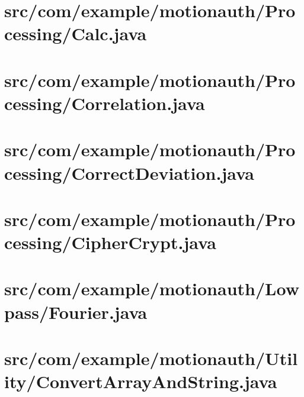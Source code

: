 \documentclass[11pt]{jreport}
\renewcommand{\slash}{/}
\begin{document}
    \section{src\slash com\slash example\slash motionauth\slash Processing\slash Calc.java}
    

    \section{src\slash com\slash example\slash motionauth\slash Processing\slash Correlation.java}
    

    \section{src\slash com\slash example\slash motionauth\slash Processing\slash CorrectDeviation.java}
    

    \section{src\slash com\slash example\slash motionauth\slash Processing\slash CipherCrypt.java}
    

    \section{src\slash com\slash example\slash motionauth\slash Lowpass\slash Fourier.java}
    

    \section{src\slash com\slash example\slash motionauth\slash Utility\slash ConvertArrayAndString.java}
    
\end{document}
